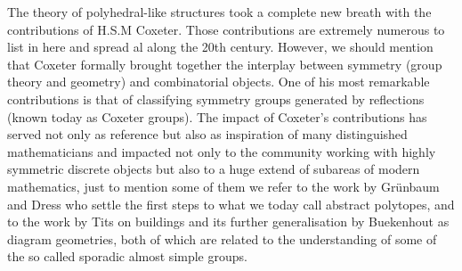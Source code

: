 The theory of polyhedral-like structures took a complete new breath with the contributions of H.S.M Coxeter. Those contributions are extremely numerous to list in here and spread al along the 20th century. However, we should mention that Coxeter formally brought together the interplay between symmetry (group theory and geometry) and combinatorial objects. One of his most remarkable contributions is that of classifying symmetry groups generated by reflections (known today as Coxeter groups).  The impact of Coxeter’s contributions has served not only as reference but also as inspiration of many distinguished mathematicians and impacted not only to the community working with highly symmetric discrete objects but also to a huge extend of subareas of modern mathematics, just to mention some of them we refer to the work by Grünbaum and Dress who settle the first steps to what we today call abstract polytopes, and to the work by Tits on buildings  and its further generalisation by Buekenhout as diagram geometries, both of which are related to the understanding of some of the so called sporadic almost simple groups.


